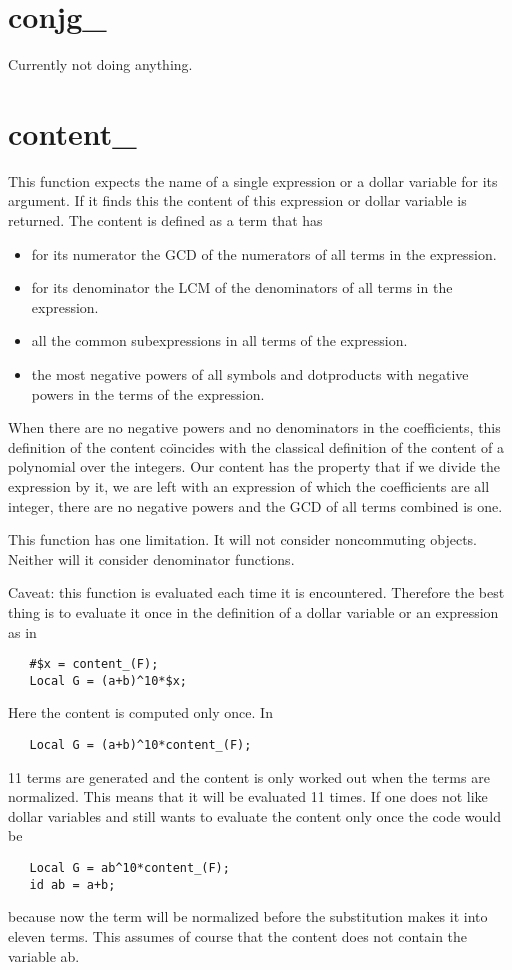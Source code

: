 
\section{conjg\_}
\label{funconjg}
\noindent Currently not doing anything.


\section{content\_}
\label{funcontent}
\noindent This function expects the name of a single expression or a dollar 
variable for its 
argument. If it finds this the content of this expression or dollar 
variable is returned. The 
content is defined as a term that has
\begin{itemize}
\item for its numerator the GCD of the numerators of all terms in the 
expression.
\item for its denominator the LCM of the denominators of all terms in the 
expression.
\item all the common subexpressions in all terms of the expression.
\item the most negative powers of all symbols and dotproducts with negative 
powers in the terms of the expression.
\end{itemize}
When there are no negative powers and no denominators in the coefficients, 
this definition of the content co\"{\i}ncides with the classical definition 
of the content of a polynomial over the integers. Our content has the 
property that if we divide the expression by it, we are left with an 
expression of which the coefficients are all integer, there are no negative 
powers and the GCD of all terms combined is one.

\noindent This function has one limitation. It will not consider 
noncommuting objects. Neither will it consider denominator functions.

\noindent Caveat: this function is evaluated each time it is encountered. 
Therefore the best thing is to evaluate it once in the definition of a 
dollar variable or an expression as in
\begin{verbatim}
   #$x = content_(F);
   Local G = (a+b)^10*$x;
\end{verbatim}
Here the content is computed only once. In
\begin{verbatim}
   Local G = (a+b)^10*content_(F);
\end{verbatim}
11 terms are generated and the content is only worked out when the 
terms are normalized. This means that it will be evaluated 11 times. If one 
does not like dollar variables and still wants to evaluate the content only 
once the code would be
\begin{verbatim}
   Local G = ab^10*content_(F);
   id ab = a+b;
\end{verbatim}
because now the term will be normalized before the substitution makes it 
into eleven terms. This assumes of course that the content does not contain 
the variable ab.

